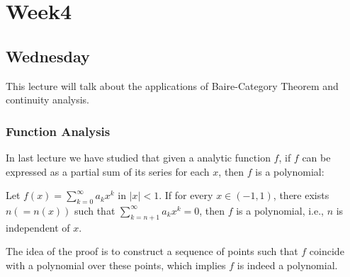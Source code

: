 
\chapter{Week4}

\section{Wednesday}
This lecture will talk about the applications of Baire-Category Theorem and continuity analysis.

\subsection{Function Analysis}
In last lecture we have studied that given a analytic function $f$, if $f$ can be expressed as a partial sum of its series for each $x$, then $f$ is a polynomial:
\begin{proposition}
Let $f(x)=\sum_{k=0}^\infty a_kx^k$ in $|x|<1$. If for every $x\in(-1,1)$, there exists $n(=n(x))$ such that $\sum_{k=n+1}^\infty a_kx^k=0$, then $f$ is a polynomial, i.e., $n$ is independent of $x$.
\end{proposition}

The idea of the proof is to construct a sequence of points such that $f$ coincide with a polynomial over these points, which implies $f$ is indeed a polynomial.



